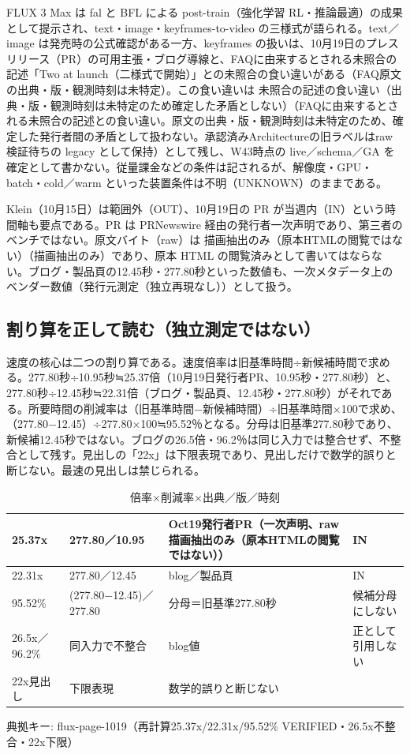 \documentclass[lualatex,a4paper,10pt]{jlreq}
\begin{document}
FLUX 3 Max は fal と BFL による post-train（強化学習 RL・推論最適）の成果として提示され、text・image・keyframes-to-video の三様式が語られる。text／image は発売時の公式確認がある一方、keyframes の扱いは、10月19日のプレスリリース（PR）の可用主張・ブログ導線と、FAQに由来するとされる未照合の記述「Two at launch（二様式で開始）」との未照合の食い違いがある（FAQ原文の出典・版・観測時刻は未特定）。この食い違いは 未照合の記述の食い違い（出典・版・観測時刻は未特定のため確定した矛盾としない）（FAQに由来するとされる未照合の記述との食い違い。原文の出典・版・観測時刻は未特定のため、確定した発行者間の矛盾として扱わない。承認済みArchitectureの旧ラベルはraw検証待ちの legacy として保持）として残し、W43時点の live／schema／GA を確定として書かない。従量課金などの条件は記されるが、解像度・GPU・batch・cold／warm といった装置条件は不明（UNKNOWN）のままである。


Klein（10月15日）は範囲外（OUT）、10月19日の PR が当週内（IN）という時間軸も要点である。PR は PRNewswire 経由の発行者一次声明であり、第三者のベンチではない。原文バイト（raw）は 描画抽出のみ（原本HTMLの閲覧ではない）（描画抽出のみ）であり、原本 HTML の閲覧済みとして書いてはならない。ブログ・製品頁の12.45秒・277.80秒といった数値も、一次メタデータ上のベンダー数値（発行元測定（独立再現なし））として扱う。


\subsection*{割り算を正して読む（独立測定ではない）}


速度の核心は二つの割り算である。速度倍率は旧基準時間÷新候補時間で求める。277.80秒÷10.95秒≒25.37倍（10月19日発行者PR、10.95秒・277.80秒）と、277.80秒÷12.45秒≒22.31倍（ブログ・製品頁、12.45秒・277.80秒）がそれである。所要時間の削減率は（旧基準時間−新候補時間）÷旧基準時間×100で求め、（277.80−12.45）÷277.80×100≒95.52％となる。分母は旧基準277.80秒であり、新候補12.45秒ではない。ブログの26.5倍・96.2％は同じ入力では整合せず、不整合として残す。見出しの「22x」は下限表現であり、見出しだけで数学的誤りと断じない。最速の見出しは禁じられる。


\begin{table}[htbp]\centering\footnotesize
\caption{倍率×削減率×出典／版／時刻}
\begin{tabularx}{0.96\linewidth}{@{}lXXX@{}}
\toprule
25.37x & 277.80／10.95 & Oct19発行者PR（一次声明、raw 描画抽出のみ（原本HTMLの閲覧ではない）） & IN \\
\midrule
22.31x & 277.80／12.45 & blog／製品頁 & IN \\
95.52\% & (277.80−12.45)／277.80 & 分母＝旧基準277.80秒 & 候補分母にしない \\
26.5x／96.2\% & 同入力で不整合 & blog値 & 正として引用しない \\
22x見出し & 下限表現 & 数学的誤りと断じない &  \\
\bottomrule
\end{tabularx}
{\scriptsize\color{SurveyMuted} 典拠キー: flux-page-1019（再計算25.37x/22.31x/95.52\% VERIFIED・26.5x不整合・22x下限）\par}
\end{table}
\end{document}
